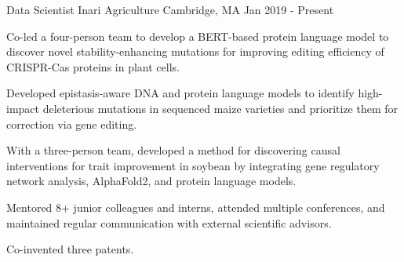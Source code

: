 

\begin{cventries}

  \cventry
    {Data Scientist} %
    {Inari Agriculture} %
    {Cambridge, MA} %
    {Jan 2019 - Present} %
    {
      \begin{cvitems} %
        \item {Co-led a four-person team to develop a BERT-based protein language model to discover novel stability-enhancing mutations for improving editing efficiency of CRISPR-Cas proteins in plant cells.}
        \item {Developed epistasis-aware DNA and protein language models to identify high-impact deleterious mutations in sequenced maize varieties and prioritize them for correction via gene editing.}
        \item {With a three-person team, developed a method for discovering causal interventions for trait improvement in soybean by integrating gene regulatory network analysis, AlphaFold2, and protein language models.}
        \item {Mentored 8+ junior colleagues and interns, attended multiple conferences, and maintained regular communication with external scientific advisors.}
        \item {Co-invented three patents.}
      \end{cvitems}
    }


\end{cventries}
